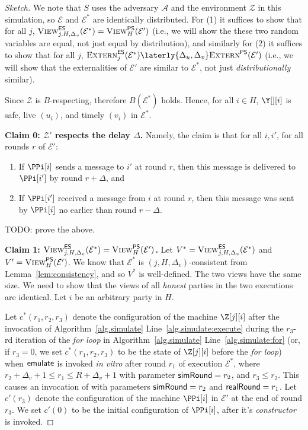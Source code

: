 \begin{proof}[Sketch]
  We note that $S$ uses the adversary $\mathcal{A}$ and the
  environment $\mathcal{Z}$ in this simulation, so $\mathcal{E}$
  and $\mathcal{E}^*$ are identically distributed.
  For (1) it suffices to show that for all $j$,
  $\textsc{View}^{\textsf{ES}}_{j,H,\Delta_v}(\mathcal{E}^*) = \textsc{View}^{\textsf{PS}}_H(\mathcal{E}')$
  (i.e., we will show the these two random variables are equal,
  not just equal by distribution),
  and similarly for (2) it suffices to show that for all $j$,
  $\LCExtern_j(\mathcal{E}^*) \laterly{\Delta_u,\Delta_v} \PEExtern(\mathcal{E}')$
  (i.e., we will show that the externalities of $\mathcal{E}'$ are
  similar to $\mathcal{E}^*$, not just \emph{distributionally} similar).

  Since $\mathcal{Z}$ is $B$-respecting, therefore $B(\mathcal{E}^*)$ holds.
  Hence, for all $i \in H$, $\Y[][i]$ is safe, live $(u_i)$, and timely $(v_i)$
  in $\mathcal{E}^*$.

  \noindent
  \textbf{Claim 0: $\mathcal{Z}'$ respects the delay $\Delta$.}
  Namely, the claim is that for all $i, i'$, for all rounds $r$ of $\mathcal{E}'$:

  \begin{enumerate}
    \item If $\PPi[i]$ sends a message to $i'$ at round $r$, then this message is delivered to $\PPi[i']$ by round $r + \Delta$, and
    \item If $\PPi[i']$ received a message from $i$ at round $r$, then this message was sent by $\PPi[i]$ no earlier than round $r - \Delta$.
  \end{enumerate}
  {\color{red} TODO: prove the above.}

  \noindent
  \textbf{Claim 1: $\textsc{View}^{\textsf{ES}}_{j,H,\Delta_v}(\mathcal{E}^*) = \textsc{View}^{\textsf{PS}}_H(\mathcal{E}')$.}
  Let $V^* = \textsc{View}^{\textsf{ES}}_{j,H,\Delta_v}(\mathcal{E}^*)$ and
  $V' = \textsc{View}^{\textsf{PS}}_H(\mathcal{E}')$.
  We know that $\mathcal{E}^*$ is $(j, H, \Delta_v)$-consistent
  from Lemma~\ref{lem:consistency}, and so $V^*$
  is well-defined.
  The two views have the same size.
  We need to show
  that the views of all \emph{honest} parties in the two executions are identical.
  Let $i$ be an arbitrary party in $H$.

  Let $c^*(r_1, r_2, r_3)$ denote the configuration
  of the machine $\Z[j][i]$ after the invocation of
  Algorithm~\ref{alg.simulate} Line~\ref{alg.simulate:execute}
  during the $r_3$-rd iteration of the \emph{for loop} in
  Algorithm~\ref{alg.simulate} Line~\ref{alg.simulate:for}
  (or, if $r_3 = 0$, we set $c^*(r_1, r_2, r_3)$ to be the state of
  $\Z[j][i]$ before the \emph{for loop})
  when $\textsf{emulate}$ is
  invoked \emph{in vitro} after round $r_1$ of execution $\mathcal{E}^*$,
  where $r_2 + \Delta_v + 1 \leq r_1 \leq R + \Delta_v + 1$ with parameter
  $\textsf{simRound} = r_2$, and $r_3 \leq r_2$.
  This causes an invocation of \simulate with parameters
  $\textsf{simRound} = r_2$ and $\textsf{realRound} = r_1$.
  Let $c'(r_3)$ denote the configuration of the machine $\PPi[i]$
  in $\mathcal{E}'$ at the end of round $r_3$.
  We set $c'(0)$ to be the initial configuration of $\PPi[i]$,
  after it's \emph{constructor} is invoked.


\end{proof}
